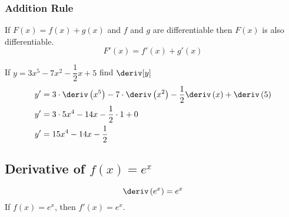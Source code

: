 \subsubsection{Addition Rule}
\begin{theorem}
    If $F(x) = f(x) + g(x)$ and $f$ and $g$ are differentiable then $F(x)$ is also differentiable.
    \begin{equation}
        F'(x) = f'(x) + g'(x)
    \end{equation}
\end{theorem}
\begin{example}
    If $y=3x^5 - 7x^2 - \dfrac{1}{2}x + 5$ find $\deriv[y]$
    \begin{align*}
        y' &= 3 \cdot \deriv \left(x^5\right) - 7 \cdot \deriv \left(x^2\right) - \dfrac{1}{2} \deriv \left(x\right) + \deriv \left(5\right)\\
        y' &= 3 \cdot 5x^4 - 14x - \dfrac{1}{2} \cdot 1 + 0 \\
        y' &= 15x^4 - 14x - \dfrac{1}{2}
    \end{align*}
\end{example}
\subsection{Derivative of \texorpdfstring{$f(x) = e^x$}{f(x) = e\textasciicircum x}}
\begin{theorem}[Derivative of $f(x) = e^x$]
    \begin{equation}
        \deriv\left(e^x\right) = e^x
    \end{equation}
    If $f(x) = e^x$, then $f'(x) = e^x$.
\end{theorem}
